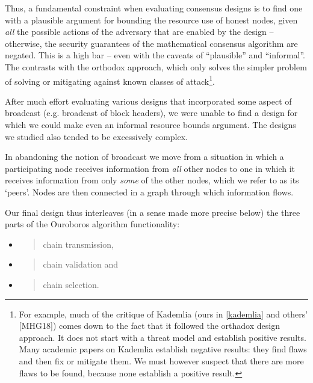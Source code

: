 \documentclass[11pt,a4paper]{article}
\begin{document}
Thus, a fundamental constraint when evaluating consensus designs is to
find one with a plausible argument for bounding the resource use of
honest nodes, given \emph{all} the possible actions of the adversary
that are enabled by the design -- otherwise, the security guarantees of
the mathematical consensus algorithm are negated. This is a high bar --
even with the caveats of ``plausible'' and ``informal''. The contrasts
with the orthodox approach, which only solves the simpler problem of
solving or mitigating against known classes of attack\footnote{For
  example, much of the critique of Kademlia (ours in
  \cref{kademlia} and others' {[}MHG18{]})
  comes down to the fact that it followed the orthadox design approach.
  It does not start with a threat model and establish positive results.
  Many academic papers on Kademlia establish negative results: they find
  flaws and then fix or mitigate them. We must however suspect that
  there are more flaws to be found, because none establish a positive
  result.}.

After much effort evaluating various designs that incorporated some
aspect of broadcast (e.g. broadcast of block headers), we were unable to
find a design for which we could make even an informal resource bounds
argument. The designs we studied also tended to be excessively complex.

In abandoning the notion of broadcast we move from a situation in which
a participating node receives information from \emph{all} other nodes to
one in which it receives information from only \emph{some} of the other
nodes, which we refer to as its `peers'. Nodes are then connected in a
graph through which information flows.

Our final design thus interleaves (in a sense made more precise below)
the three parts of the Ouroboros algorithm functionality:

\begin{itemize}
\item
  \begin{quote}
  chain transmission,
  \end{quote}
\item
  \begin{quote}
  chain validation and
  \end{quote}
\item
  \begin{quote}
  chain selection.
  \end{quote}
\end{itemize}
\end{document}
